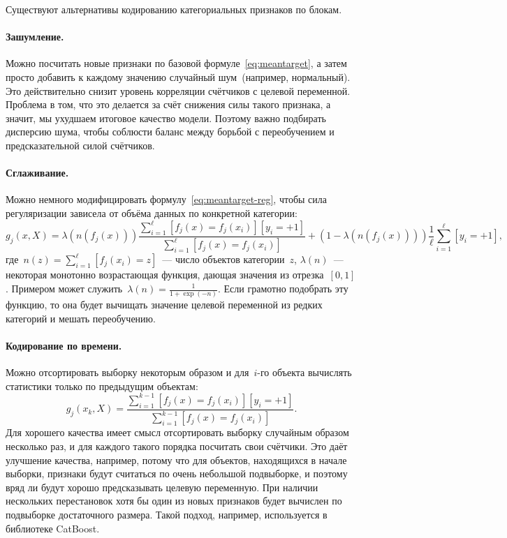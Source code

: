 \documentclass[12pt,fleqn]{article}
\begin{document}
Существуют альтернативы кодированию категориальных признаков по блокам.

\paragraph{Зашумление.}
Можно посчитать новые признаки по базовой формуле~\eqref{eq:meantarget},
а затем просто добавить к каждому значению случайный шум~(например, нормальный).
Это действительно снизит уровень корреляции счётчиков с целевой переменной.
Проблема в том, что это делается за счёт снижения силы такого признака,
а значит, мы ухудшаем итоговое качество модели.
Поэтому важно подбирать дисперсию шума, чтобы соблюсти баланс между борьбой с переобучением
и предсказательной силой счётчиков.

\paragraph{Сглаживание.}
Можно немного модифицировать формулу~\eqref{eq:meantarget-reg},
чтобы сила регуляризации зависела от объёма данных по конкретной категории:
\begin{equation*}
    g_j(x, X)
    =
    \lambda \left( n(f_j(x)) \right)
    \frac{
        \sum_{i=1}^{\ell}
            [f_j(x) = f_j(x_i)][y_i = +1]
    }{
        \sum_{i=1}^{\ell}
        [f_j(x) = f_j(x_i)]
    }
    +
    \left( 1 - \lambda \left( n(f_j(x)) \right) \right)
    \frac{1}{\ell}
    \sum_{i = 1}^{\ell}
        [y_i = +1]
    ,
\end{equation*}
где~$n(z) = \sum_{i = 1}^{\ell} [f_j(x_i) = z]$~--- число объектов категории~$z$,
$\lambda(n)$~--- некоторая монотонно возрастающая функция, дающая значения из отрезка~$[0, 1]$.
Примером может служить~$\lambda(n) = \frac{1}{1 + \exp(-n)}$.
Если грамотно подобрать эту функцию, то она будет вычищать значение целевой переменной
из редких категорий и мешать переобучению.

\paragraph{Кодирование по времени.}
Можно отсортировать выборку некоторым образом и для~$i$-го объекта вычислять статистики только по предыдущим объектам:
\begin{equation*}
    g_j(x_k, X)
    =
    \frac{
        \sum_{i=1}^{k - 1}
            [f_j(x) = f_j(x_i)][y_i = +1]
    }{
        \sum_{i=1}^{k - 1}
            [f_j(x) = f_j(x_i)]
    }.
\end{equation*}
Для хорошего качества имеет смысл отсортировать выборку случайным образом несколько раз,
и для каждого такого порядка посчитать свои счётчики.
Это даёт улучшение качества, например, потому что для объектов, находящихся в начале выборки,
признаки будут считаться по очень небольшой подвыборке, и поэтому вряд ли будут хорошо предсказывать
целевую переменную.
При наличии нескольких перестановок хотя бы один из новых признаков будет вычислен по подвыборке
достаточного размера.
Такой подход, например, используется в библиотеке CatBoost.
\end{document}
